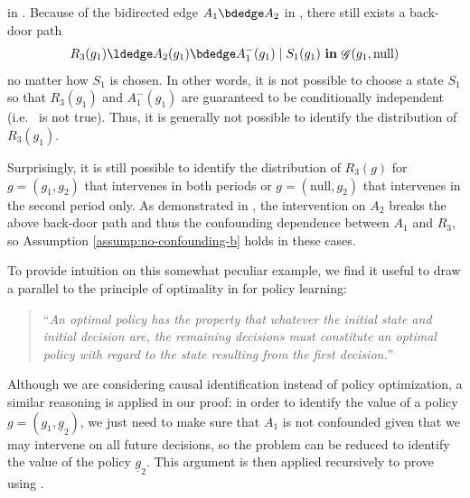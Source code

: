 \documentclass[12pt,a4paper]{article}
\theoremstyle{definition}
\newcommand{\ingraph}[1]{~\textnormal{\bf in}\,#1}
\DeclareMathOperator{\gG}{\mathscr{G}}
\begin{document}
in
.
Because of the bidirected edge $A_1 \bdedge A_2$ in
, there still exists a back-door path
\[
    R_3(g_1) \ldedge A_2(g_1) \bdedge A_1^{-}(g_1) \mid S_1(g_1) \ingraph{\gG(g_1,\text{null})}
\]
no matter how $S_1$ is chosen. In other words, it is not possible to
choose a state $S_1$ so that $R_3(g_1)$ and $A_1^{-}(g_1)$ are
guaranteed to be conditionally
independent (i.e.\ 
is not true). Thus, it is generally not possible to identify the
distribution of $R_3(g_1)$.

Surprisingly, it is still possible to identify the
distribution of $R_3(g)$ for $g = (g_1,g_2)$ that intervenes
in both periods
or $g = (\text{null}, g_2)$ that intervenes in the second period
only. As
demonstrated in , the
intervention on $A_2$ breaks the above back-door path and thus the
confounding dependence between $A_1$ and $R_3$, so Assumption
\ref{assump:no-confounding-b} holds in these cases. %

To provide intuition on this somewhat peculiar example, we
find it useful to draw a parallel to the principle of
optimality in \textcite[Chap.\ III.\ 3]{bellman_dynamic_1957} for
policy learning:
\begin{quote}
    ``\emph{An optimal policy has the property that whatever the
      initial state and initial decision are, the remaining decisions
      must constitute an optimal policy with regard to the state
      resulting from the first decision.}''
\end{quote}
Although we are considering causal identification instead
of policy optimization, a similar reasoning is applied in our proof: in order
to identify the value of a policy $g = (g_1,
\underline{g}_2)$, we just need to make sure that $A_1$ is not
confounded given that we may intervene on all future decisions, so the
problem can be reduced to identify the value of the policy
$\underline{g}_2$. This argument is then applied recursively to prove
 using .
\end{document}
